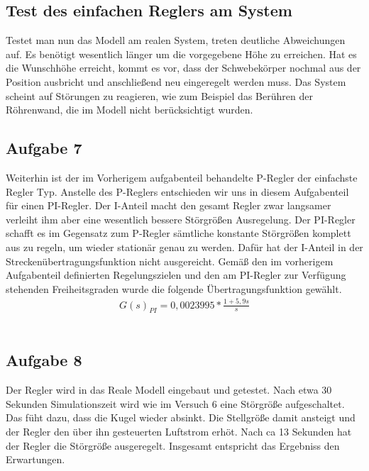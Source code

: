 \documentclass[10pt]{scrartcl}
\begin{document}

\subsection{Test des einfachen Reglers am System}
Testet man nun das Modell am realen System, treten deutliche Abweichungen auf. Es benötigt wesentlich länger um die vorgegebene Höhe zu erreichen. Hat es die Wunschhöhe erreicht, kommt es vor, dass der Schwebekörper nochmal aus der Position ausbricht und anschließend neu eingeregelt werden muss. Das System scheint auf Störungen zu reagieren, wie zum Beispiel das Berühren der Röhrenwand, die im Modell nicht berücksichtigt wurden.

\subsection{Aufgabe 7}	
Weiterhin ist der im Vorherigem aufgabenteil behandelte P-Regler der einfachste Regler Typ. Anstelle des P-Reglers entschieden wir uns in diesem Aufgabenteil für einen PI-Regler. Der I-Anteil macht den gesamt Regler zwar langsamer verleiht ihm aber eine wesentlich bessere Störgrößen Ausregelung. Der PI-Regler schafft es im Gegensatz zum P-Regler sämtliche konstante Störgrößen komplett aus zu regeln, um wieder stationär genau zu werden. Dafür hat der I-Anteil in der Streckenübertragungsfunktion nicht ausgereicht. Gemäß den im vorherigem Aufgabenteil definierten Regelungszielen und den am PI-Regler zur Verfügung stehenden Freiheitsgraden wurde die folgende Übertragungsfunktion gewählt. 
\begin{align}
   G(s)_{PI}=0,0023995*\frac{1+5,9s}{s}
\end{align} \\
\subsection{Aufgabe 8}	
Der Regler wird in das Reale Modell eingebaut und getestet.
Nach etwa 30 Sekunden Simulationszeit wird wie im Versuch 6 eine Störgröße aufgeschaltet. Das füht dazu, dass die Kugel wieder absinkt. Die Stellgröße damit ansteigt und der Regler den über ihn gesteuerten Luftstrom erhöt. Nach ca 13 Sekunden hat der Regler die Störgröße ausgeregelt. Insgesamt entspricht das Ergebniss den Erwartungen.\\
\end{document}
